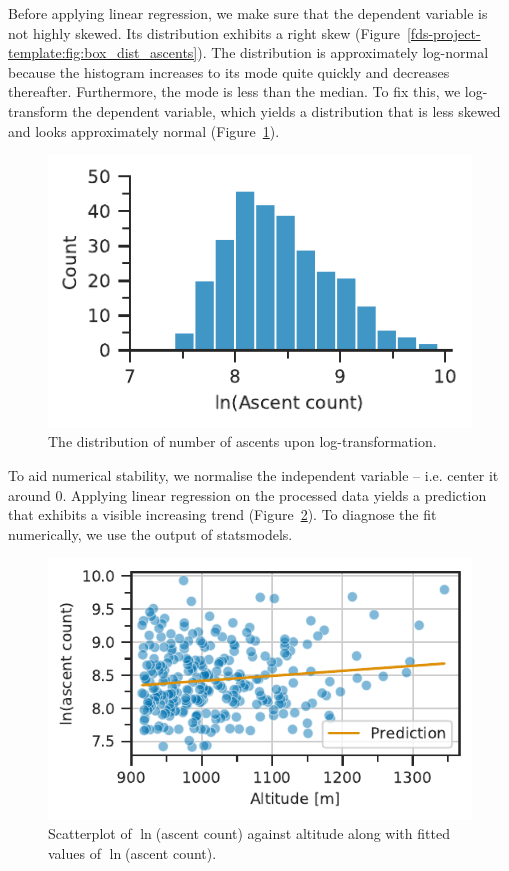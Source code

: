 \documentclass[11pt,a4paper]{article}
\begin{document}
Before applying linear regression, we make sure that the dependent variable is not highly skewed. Its distribution exhibits a right skew (Figure~\ref{fds-project-template:fig:box_dist_ascents}). The distribution is approximately log-normal because the histogram increases to its mode quite quickly and decreases thereafter. Furthermore, the mode is less than the median. To fix this, we log-transform the dependent variable, which yields a distribution that is less skewed and looks approximately normal (Figure~\ref{fds-project-template:fig:dist_log_ascent_count}).
\begin{figure} [h!]
  \centering
  \includegraphics{report/ascent_count_distribution.pdf}
  \caption{The distribution of number of ascents upon log-transformation.}
  \label{fds-project-template:fig:dist_log_ascent_count}
\end{figure}

To aid numerical stability, we normalise the independent variable – i.e. center it around 0. Applying linear regression on the processed data yields a prediction that exhibits a visible increasing trend (Figure~\ref{fds-project-template:fig:q1_prediction}). To diagnose the fit numerically, we use the output of statsmodels.
\begin{figure} [h!]
  \centering
  \includegraphics{report/q1_prediction.pdf}
  \caption{Scatterplot of $\ln$(ascent count) against altitude along with fitted values of $\ln$(ascent count).}
  \label{fds-project-template:fig:q1_prediction}
\end{figure}
\end{document}
